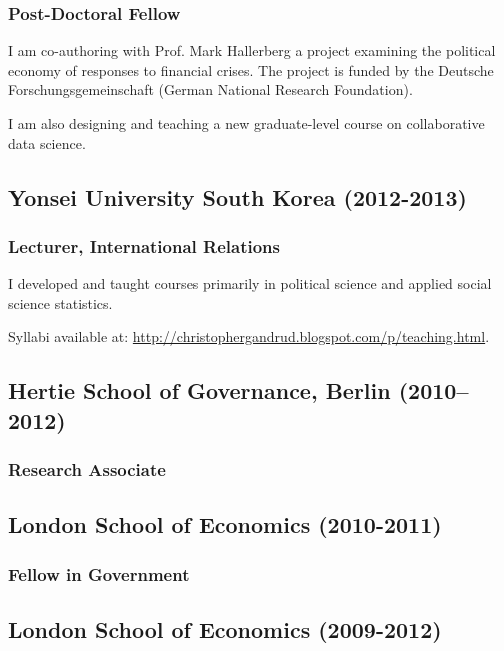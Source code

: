 \documentclass[a4paper]{article}
\begin{document}
{\subsubsection*{Post-Doctoral Fellow}

I am co-authoring with Prof. Mark Hallerberg a project examining the political economy of responses to financial crises. The project is funded by the Deutsche Forschungsgemeinschaft (German National Research Foundation).\vspace{0.25cm}

\noindent I am also designing and teaching a new graduate-level course on collaborative data science.

\subsection*{Yonsei University South Korea (2012-2013)}
{\subsubsection*{Lecturer, International Relations}

I developed and taught courses primarily in political science and applied social science statistics.
\vspace{0.25cm}

\noindent Syllabi available at: \url{http://christophergandrud.blogspot.com/p/teaching.html}.

\subsection*{Hertie School of Governance, Berlin (2010--2012)}
\subsubsection*{Research Associate}

\subsection*{London School of Economics (2010-2011)}
\subsubsection*{Fellow in Government}

\subsection*{London School of Economics (2009-2012)}
}}
\end{document}
